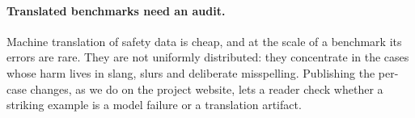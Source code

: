 \paragraph{Translated benchmarks need an audit.} Machine translation of safety
data is cheap, and at the scale of a benchmark its errors are rare. They are
not uniformly distributed: they concentrate in the cases whose harm lives in
slang, slurs and deliberate misspelling. Publishing the per-case changes, as we
do on the project website, lets a reader check whether a striking example is a
model failure or a translation artifact.
